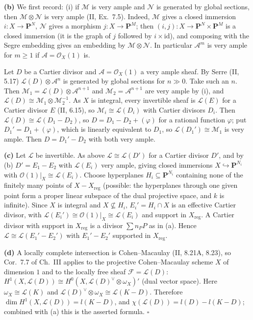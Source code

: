 \documentclass[11pt]{article}
\begin{document}
\textbf{(b)} We first record: (i) if $\mathcal M$ is very ample and $\mathcal N$ is generated by global sections, then $\mathcal M\otimes\mathcal N$ is very ample (II, Ex.~7.5). Indeed, $\mathcal M$ gives a closed immersion $i:X\to\mathbf P^N$, $\mathcal N$ gives a morphism $j:X\to\mathbf P^M$; then $(i,j):X\to\mathbf P^N\times\mathbf P^M$ is a closed immersion (it is the graph of $j$ followed by $i\times\mathrm{id}$), and composing with the Segre embedding gives an embedding by $\mathcal M\otimes\mathcal N$. In particular $\mathcal A^m$ is very ample for $m\ge1$ if $\mathcal A=\mathcal O_X(1)$ is.

Let $D$ be a Cartier divisor and $\mathcal A=\mathcal O_X(1)$ a very ample sheaf. By Serre (II, 5.17) $\mathcal L(D)\otimes\mathcal A^n$ is generated by global sections for $n\gg0$. Take such an $n$. Then $\mathcal M_1=\mathcal L(D)\otimes\mathcal A^{n+1}$ and $\mathcal M_2=\mathcal A^{n+1}$ are very ample by (i), and $\mathcal L(D)\cong\mathcal M_1\otimes\mathcal M_2^{-1}$. As $X$ is integral, every invertible sheaf is $\mathcal L(E)$ for a Cartier divisor $E$ (II, 6.15), so $\mathcal M_i\cong\mathcal L(D_i)$ with Cartier divisors $D_i$. Then $\mathcal L(D)\cong\mathcal L(D_1-D_2)$, so $D=D_1-D_2+(\varphi)$ for a rational function $\varphi$; put $D_1'=D_1+(\varphi)$, which is linearly equivalent to $D_1$, so $\mathcal L(D_1')\cong\mathcal M_1$ is very ample. Then $D=D_1'-D_2$ with both very ample.

\textbf{(c)} Let $\mathcal L$ be invertible. As above $\mathcal L\cong\mathcal L(D')$ for a Cartier divisor $D'$, and by (b) $D'=E_1-E_2$ with $\mathcal L(E_i)$ very ample, giving closed immersions $X\hookrightarrow\mathbf P^{N_i}$ with $\mathcal O(1)|_X\cong\mathcal L(E_i)$. Choose hyperplanes $H_i\subseteq\mathbf P^{N_i}$ containing none of the finitely many points of $X-X_{\mathrm{reg}}$ (possible: the hyperplanes through one given point form a proper linear subspace of the dual projective space, and $k$ is infinite). Since $X$ is integral and $X\not\subseteq H_i$, $E_i'=H_i\cap X$ is an effective Cartier divisor, with $\mathcal L(E_i')\cong\mathcal O(1)|_X\cong\mathcal L(E_i)$ and support in $X_{\mathrm{reg}}$. A Cartier divisor with support in $X_{\mathrm{reg}}$ is a divisor $\sum n_PP$ as in (a). Hence $\mathcal L\cong\mathcal L(E_1'-E_2')$ with $E_1'-E_2'$ supported in $X_{\mathrm{reg}}$.

\textbf{(d)} A locally complete intersection is Cohen--Macaulay (II, 8.21A, 8.23), so Cor.~7.7 of Ch.~III applies to the projective Cohen--Macaulay scheme $X$ of dimension $1$ and to the locally free sheaf $\mathcal F=\mathcal L(D)$: $H^1(X,\mathcal L(D))\cong H^0(X,\mathcal L(D)^\vee\otimes\omega_X)'$ (dual vector space). Here $\omega_X\cong\mathcal L(K)$ and $\mathcal L(D)^\vee\otimes\omega_X\cong\mathcal L(K-D)$. Therefore $\dim H^1(X,\mathcal L(D))=l(K-D)$, and $\chi(\mathcal L(D))=l(D)-l(K-D)$; combined with (a) this is the asserted formula. \hfill$\square$
\end{document}
